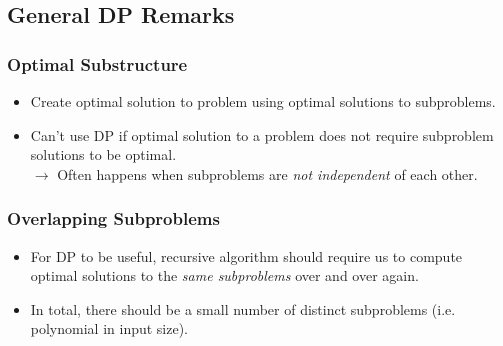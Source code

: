 \documentclass{article}
\begin{document}
\small

\setlength{\parindent}{0em}
\setlength{\itemindent}{0em}
\setlength{\leftmargini}{0em}

\begin{multicols*}{2}
    \subsection*{General DP Remarks}
    \subsubsection*{Optimal Substructure}
    \begin{itemize}
        \item Create optimal solution to problem using optimal solutions to
              subproblems.
        \item Can't use DP if optimal solution to a problem does not require
              subproblem solutions to be optimal. \\
              \(\rightarrow\) Often happens when subproblems are \emph{not
                  independent} of each other.
    \end{itemize}
    \subsubsection*{Overlapping Subproblems}
    \begin{itemize}
        \item For DP to be useful, recursive algorithm should require us to
              compute optimal solutions to the \emph{same subproblems} over and
              over again.
        \item In total, there should be a small number of distinct subproblems
              (i.e. polynomial in input size).
    \end{itemize}


\end{multicols*}
\end{document}
